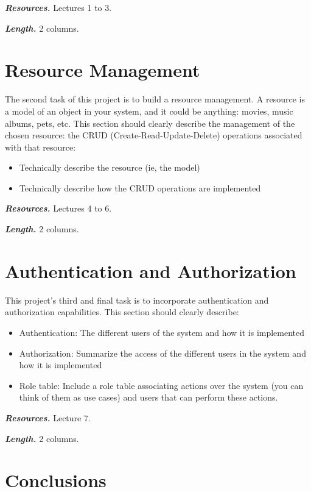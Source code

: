 \documentclass[letterpaper,twocolumn]{article}
\newcommand{\myparagraph}[1]{\vspace{0.1cm}\noindent \textbf{\textit{#1.}}}
\begin{document}
\myparagraph{Resources} Lectures 1 to 3.

\myparagraph{Length} 2 columns.

\section{Resource Management}

The second task of this project is to build a resource management.
A resource is a model of an object in your system, and it could be anything: movies, music albums, pets, etc.
This section should clearly describe the management of the chosen resource: the CRUD (Create-Read-Update-Delete) operations associated with that resource:

\begin{itemize}
    \item Technically describe the resource (ie, the model)
    \item Technically describe how the CRUD operations are implemented
\end{itemize}

\myparagraph{Resources} Lectures 4 to 6.

\myparagraph{Length} 2 columns.

\section{Authentication and Authorization}

This project's third and final task is to incorporate authentication and authorization capabilities.
This section should clearly describe:

\begin{itemize}
    \item Authentication: The different users of the system and how it is implemented
    \item Authorization: Summarize the access of the different users in the system and how it is implemented
    \item Role table: Include a role table associating actions over the system (you can think of them as use cases) and users that can perform these actions.
\end{itemize}

\myparagraph{Resources} Lecture 7.

\myparagraph{Length} 2 columns.

\section{Conclusions}
\end{document}
